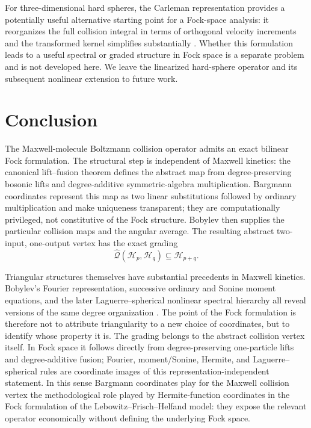 \documentclass[11pt,oneside]{article}
\numberwithin{equation}{section}
\theoremstyle{definition}
\begin{document}
For three-dimensional hard spheres, the Carleman representation provides a potentially useful alternative starting point for a Fock-space analysis: it reorganizes the full collision integral in terms of orthogonal velocity increments and the transformed kernel simplifies substantially \cite{MouhotPareschi2006FastBoltzmann}.  Whether this formulation leads to a useful spectral or graded structure in Fock space is a separate problem and is not developed here.  We leave the linearized hard-sphere operator and its subsequent nonlinear extension to future work.

\section{Conclusion}
\label{sec:maxwell_conclusion}

The Maxwell-molecule Boltzmann collision operator admits an exact bilinear
Fock formulation.  The structural step is independent of Maxwell
kinetics: the canonical lift--fusion theorem defines the abstract map from
degree-preserving bosonic lifts and degree-additive symmetric-algebra
multiplication.  Bargmann coordinates represent this map as two linear
substitutions followed by ordinary multiplication and make uniqueness
transparent; they are computationally privileged, not constitutive of the
Fock structure.  Bobylev then supplies the particular collision maps and
the angular average.  The resulting abstract two-input, one-output
vertex has the exact grading
\begin{equation}
\widehat{\mathcal Q}(\mathscr H_p,\mathscr H_q)
\subseteq
\mathscr H_{p+q}.
\end{equation}

Triangular structures themselves have substantial precedents in Maxwell
kinetics.  Bobylev's Fourier representation, successive ordinary and
Sonine moment equations, and the later Laguerre--spherical nonlinear
spectral hierarchy all reveal versions of the same degree organization
\cite{Bobylev1975Fourier,Bobylev1984ExactRelaxation,Bobylev1988MaxwellReview,Ernst1979MaxwellMoments,GlangetasLiXu2016Triangular}.
The point of the Fock formulation is therefore not to attribute
triangularity to a new choice of coordinates, but to identify whose
property it is.  The grading belongs to the abstract collision vertex
itself.  In Fock space it follows directly from degree-preserving
one-particle lifts and degree-additive fusion; Fourier, moment/Sonine,
Hermite, and Laguerre--spherical rules are coordinate images of this
representation-independent statement.  In this sense Bargmann coordinates play for the Maxwell collision vertex the methodological role played by Hermite-function coordinates in the Fock formulation of the Lebowitz--Frisch--Helfand model: they expose the relevant operator economically without defining the underlying Fock space.
\end{document}
